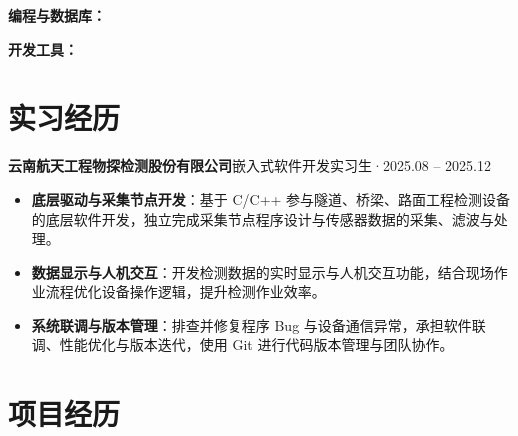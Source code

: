 \documentclass[10pt,a4paper]{article}
\begin{document}
\vspace{2pt}

{\bfseries\color{primary}编程与数据库：}

\vspace{2pt}

{\bfseries\color{primary}开发工具：}

\section{\faBriefcase\hspace{0.4em}实习经历}

{\bfseries 云南航天工程物探检测股份有限公司}\hfill{\color{graytext}嵌入式软件开发实习生\hspace{0.3em}·\hspace{0.3em}2025.08 -- 2025.12}

\vspace{2pt}

\begin{itemize}[leftmargin=1.5em, itemsep=1pt, parsep=0pt, topsep=2pt]
    \item \textbf{底层驱动与采集节点开发}：基于 C/C++ 参与隧道、桥梁、路面工程检测设备的底层软件开发，独立完成采集节点程序设计与传感器数据的采集、滤波与处理。
    \item \textbf{数据显示与人机交互}：开发检测数据的实时显示与人机交互功能，结合现场作业流程优化设备操作逻辑，提升检测作业效率。
    \item \textbf{系统联调与版本管理}：排查并修复程序 Bug 与设备通信异常，承担软件联调、性能优化与版本迭代，使用 Git 进行代码版本管理与团队协作。
\end{itemize}

\vspace{0.2em}

\section{\faProjectDiagram\hspace{0.4em}项目经历}
\end{document}
